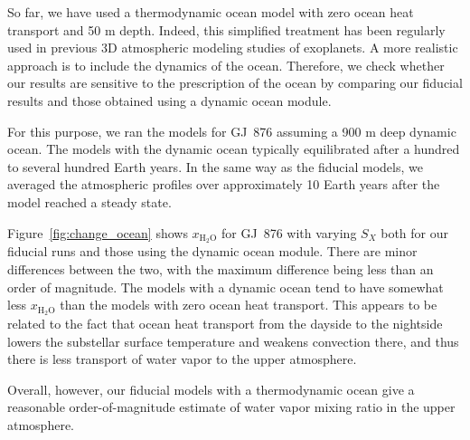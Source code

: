 \documentclass[11pt,numberedappendix,twocolappendix,]{emulateapj}
\def\water{H$_2$O}
\def\xwater{$x_\text{\water}$}
\def\wv{water vapor}
\begin{document}
So far, we have used a thermodynamic ocean model with zero ocean heat transport and 50 m depth. 
Indeed, this simplified treatment has been regularly used in previous 3D atmospheric modeling studies of exoplanets. 
A more realistic approach is to include the dynamics of the ocean. 
Therefore, we check whether our results are sensitive to the prescription of the ocean by comparing our fiducial results and those obtained using a dynamic ocean module. 

For this purpose, we ran the models for GJ~876 assuming a 900 m deep dynamic ocean. 
The models with the dynamic ocean typically equilibrated after a hundred to several hundred Earth years. 
In the same way as the fiducial models, we averaged the atmospheric profiles  over approximately 10 Earth years after the model reached a steady state. 

Figure~\ref{fig:change_ocean} shows \xwater{} for GJ~876 with varying $S_X$ both for our fiducial runs and those using the dynamic ocean module.  
There are minor differences between the two, with the maximum difference being less than an order of magnitude. 
The models with a dynamic ocean tend to have somewhat less \xwater{} than the models with zero ocean heat transport. 
This appears to be related to the fact that ocean heat transport from the dayside to the nightside lowers the substellar surface temperature and weakens convection there, and thus there is less transport of water vapor to the upper atmosphere. 


Overall, however, our fiducial models with a thermodynamic ocean give a reasonable order-of-magnitude estimate of \wv{} mixing ratio in the upper atmosphere. 
\end{document}
